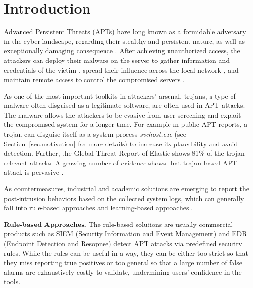 \section{Introduction}
Advanced Persistent Threats (APTs) have long known as a formidable adversary in the cyber landscape,
regarding their stealthy and persistent nature, 
as well as exceptionally damaging consequence \cite{aptsplunk2023, aptsingtel2023, aptpicus2023, aptstonefly2023, apttechtarget2023}.
After achieving unauthorized access, 
the attackers can deploy their malware on the server to 
gather information and credentials of the victim \cite{microsoftcredentials2023, crowdstrikecredentials2022},
spread their influence across the local network \cite{crowdstrikelateralmovement2023, sentinelonelateralmovement2023}, and
maintain remote access to control the compromised servers \cite{mandiantpersistence2022, dfirpersistence2022}.

As one of the most important toolkits in attackers' arsenal,
trojans, a type of malware often disguised as a legitimate software,  
are often used in APT attacks.
The malware allows the attackers to 
be evasive from user screening and
exploit the compromised system for a longer time.
For example in public APT reports, 
a trojan can disguise itself as a system process \textit{svchost.exe} (see Section~\ref{sec:motivation} for more details)
to increase its plausibility and avoid detection.
Further, the Global Threat Report of Elastic \cite{elasticreport2022} shows 81\% of the trojan-relevant attacks.
A growing number of evidence shows that trojan-based APT attack is 
pervasive \cite{valeros2020growth, mitre_g0016}. 


As countermeasures, industrial and academic solutions \cite{karantzas2021empirical, cheng2023kairos,alsaheel2021atlas,han2020unicorn,inam2022sok,han2021sigl} are emerging to
report the post-intrusion behaviors based on the collected system logs,
which can generally fall into rule-based approaches \cite{milajerdi2019holmes,milajerdi2019poirot,hossain2020combating} and learning-based approaches \cite{liu2018towards,hassan2019nodoze,hassan2020we, wang2022threatrace,han2020unicorn,wang2020you}. 

\noindent\textbf{Rule-based Approaches.}
The rule-based solutions are usually commercial products \cite{milajerdi2019holmes,milajerdi2019poirot,hossain2020combating} such as SIEM (Security Information and Event Management) and EDR (Endpoint Detection and Resopnse) detect APT attacks via predefined security rules.
While the rules can be useful in a way,
they can be either too strict so that they miss reporting true positives or
too general so that a large number of false alarms are exhaustively costly to validate,
undermining users' confidence in the tools.

